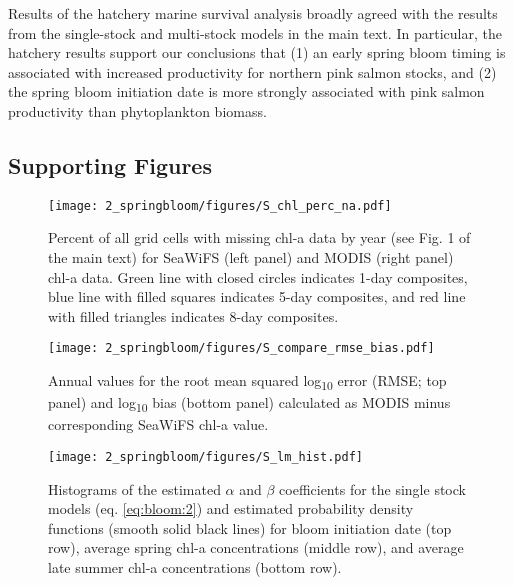 Results of the hatchery marine survival analysis broadly agreed with the results
from the single-stock and multi-stock models in the main text.  In particular,
the hatchery results support our conclusions that (1) an early spring bloom
timing is associated with increased productivity for northern pink salmon
stocks, and (2) the spring bloom initiation date is more strongly associated
with pink salmon productivity than phytoplankton biomass.


\subsection{Supporting Figures}

\begin{figure}[htbp]
  \centering \texttt{[image: 2\_springbloom/figures/S\_chl\_perc\_na.pdf]}
  \caption[Percent of data missing for SeaWifFS and MODIS chl-a data.]{Percent 
    of all grid cells with missing chl-a data by year (see Fig. 1
    of the main text) for SeaWiFS (left panel) and MODIS (right panel) chl-a
    data. Green line with closed circles indicates 1-day composites, blue line
    with filled squares indicates 5-day composites, and red line with filled
    triangles indicates 8-day composites.}
  \label{fig:bloom:s1}
\end{figure}


\begin{figure}[htbp]
  \centering
  \texttt{[image: 2\_springbloom/figures/S\_compare\_rmse\_bias.pdf]}
  \caption[Annual comparisons of SeaWiFS and MODIS data sets.]{Annual 
    values for the root mean squared log\textsubscript{10} error
   (RMSE; top panel) and log\textsubscript{10} bias (bottom panel) calculated
    as MODIS minus corresponding SeaWiFS chl-a value.}
  \label{fig:bloom:s2}
\end{figure}

\begin{figure}[htbp]
  \centering
  \texttt{[image: 2\_springbloom/figures/S\_lm\_hist.pdf]}
  \caption[Histograms of the estimated $\alpha$ and $\beta$ coefficients from the
    single-stock models.]{Histograms of the estimated \(\alpha\) and \(\beta\)
    coefficients for the single stock models (eq. \ref{eq:bloom:2}) and
    estimated probability density functions (smooth solid black lines) for bloom
    initiation date (top row), average spring chl-a concentrations (middle row),
    and average late summer chl-a concentrations (bottom row).}
  \label{fig:bloom:s3}
\end{figure}

